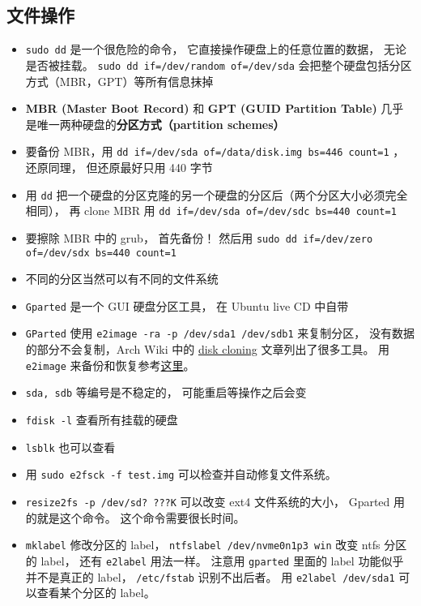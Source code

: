 
\begin{issues}
\issueDraft
\end{issues}

\subsection{文件操作}
\begin{itemize}
\item \verb`sudo dd` 是一个很危险的命令， 它直接操作硬盘上的任意位置的数据， 无论是否被挂载。 \verb`sudo dd if=/dev/random of=/dev/sda` 会把整个硬盘包括分区方式（MBR，GPT）等所有信息抹掉
\item \textbf{MBR (Master Boot Record)} 和 \textbf{GPT (GUID Partition Table)} 几乎是唯一两种硬盘的\textbf{分区方式（partition schemes）}
\item 要备份 MBR，用 \verb`dd if=/dev/sda of=/data/disk.img bs=446 count=1` ， 还原同理， 但还原最好只用 440 字节
\item 用 \verb`dd` 把一个硬盘的分区克隆的另一个硬盘的分区后（两个分区大小必须完全相同）， 再 clone MBR 用 \verb`dd if=/dev/sda of=/dev/sdc bs=440 count=1`
\item 要擦除 MBR 中的 grub， 首先备份！ 然后用 \verb`sudo dd if=/dev/zero of=/dev/sdx bs=440 count=1`
\item 不同的分区当然可以有不同的文件系统
\item \verb`Gparted` 是一个 GUI 硬盘分区工具， 在 Ubuntu live CD 中自带
\item \verb`GParted` 使用 \verb`e2image -ra -p /dev/sda1 /dev/sdb1` 来复制分区， 没有数据的部分不会复制，Arch Wiki 中的 \href{https://wiki.archlinux.org/title/disk_cloning}{disk cloning} 文章列出了很多工具。 用 \verb`e2image` 来备份和恢复参考\href{https://stackoverflow.com/questions/51755887/backup-and-restore-e2image-how-do-i-properly-pipe-the-output-from-lzop}{这里}。
\item \verb`sda, sdb` 等编号是不稳定的， 可能重启等操作之后会变
\item \verb`fdisk -l` 查看所有挂载的硬盘
\item \verb`lsblk` 也可以查看
\item 用 \verb`sudo e2fsck -f test.img` 可以检查并自动修复文件系统。
\item \verb`resize2fs -p /dev/sd? ???K` 可以改变 ext4 文件系统的大小， Gparted 用的就是这个命令。 这个命令需要很长时间。
\item \verb`mklabel` 修改分区的 label， \verb`ntfslabel /dev/nvme0n1p3 win` 改变 ntfs 分区的 label， 还有 \verb`e2label` 用法一样。 注意用 \verb`gparted` 里面的 label 功能似乎并不是真正的 label， \verb`/etc/fstab` 识别不出后者。 用 \verb`e2label /dev/sda1` 可以查看某个分区的 label。

\end{itemize}
